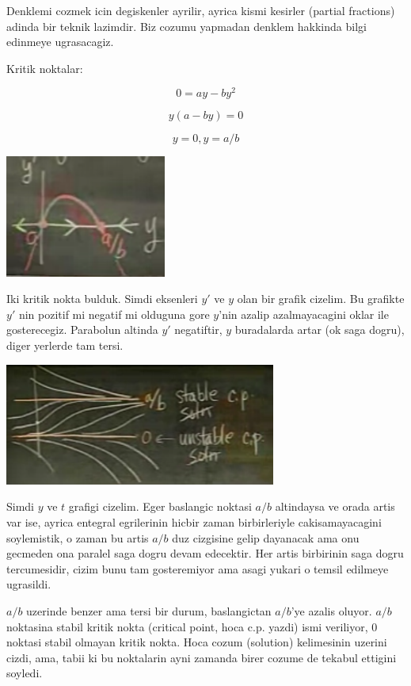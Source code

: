 \documentclass[12pt,fleqn]{article}
\begin{document}
Denklemi cozmek icin degiskenler ayrilir, ayrica kismi kesirler (partial
fractions) adinda bir teknik lazimdir. Biz cozumu yapmadan denklem hakkinda
bilgi edinmeye ugrasacagiz. 

Kritik noktalar: 

\[ 0 = ay - by^2 \]

\[ y(a-by) = 0\]

\[ y = 0, y=a/b \]

\includegraphics[height=4cm]{5_7.png}

Iki kritik nokta bulduk. Simdi eksenleri $y'$ ve $y$ olan bir grafik
cizelim. Bu grafikte $y'$ nin pozitif mi negatif mi olduguna gore $y$'nin
azalip azalmayacagini oklar ile gosterecegiz. Parabolun altinda $y'$
negatiftir, $y$ buradalarda artar (ok saga dogru), diger yerlerde tam
tersi. 

\includegraphics[height=4cm]{5_8.png}

Simdi $y$ ve $t$ grafigi cizelim. Eger baslangic noktasi $a/b$ altindaysa
ve orada artis var ise, ayrica entegral egrilerinin hicbir zaman
birbirleriyle cakisamayacagini soylemistik, o zaman bu artis $a/b$ duz
cizgisine gelip dayanacak ama onu gecmeden ona paralel saga dogru devam
edecektir. Her artis birbirinin saga dogru tercumesidir, cizim bunu tam
gosteremiyor ama asagi yukari o temsil edilmeye ugrasildi.

$a/b$ uzerinde benzer ama tersi bir durum, baslangictan $a/b$'ye azalis
oluyor. $a/b$ noktasina stabil kritik nokta (critical point, hoca
c.p. yazdi) ismi veriliyor, $0$ noktasi stabil olmayan kritik nokta. Hoca
cozum (solution) kelimesinin uzerini cizdi, ama, tabii ki bu noktalarin
ayni zamanda birer cozume de tekabul ettigini soyledi.
\end{document}
